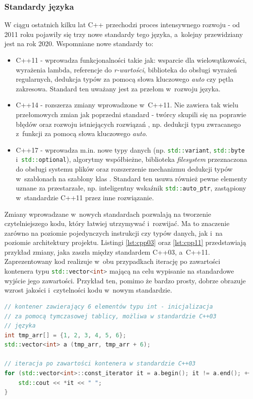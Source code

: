 \subsubsection*{Standardy języka}
W ciągu ostatnich kilku lat C++ przechodzi proces intensywnego rozwoju - od 2011 roku pojawiły się trzy nowe standardy tego języka, a~kolejny przewidziany jest na rok 2020. Wspomniane nowe standardy to:
\begin{itemize}
\item C++11 - wprowadza funkcjonalności takie jak: wsparcie dla wielowątkowości, wyrażenia lambda, referencje do \textit{r-wartości}, biblioteka do obsługi wyrażeń regularnych, dedukcja typów za pomocą słowa kluczowego \textit{auto} czy pętla zakresowa. Standard ten uważany jest za przełom w~rozwoju języka.
\item C++14 - rozszerza zmiany wprowadzone w~C++11. Nie zawiera tak wielu przełomowych zmian jak poprzedni standard - twórcy skupili się na poprawie błędów oraz rozwoju istniejących rozwiązań \cite{Cpp14Wikipedia}, np. dedukcji typu zwracanego z~funkcji za pomocą słowa kluczowego \textit{auto}.
\item C++17 - wprowadza m.in. nowe typy danych (np. \lstinline[language=c++]{std::variant}, \lstinline[language=c++]{std::byte} i~\lstinline[language=c++]{std::optional}), algorytmy współbieżne, biblioteka \textit{filesystem} przeznaczona do obsługi systemu plików oraz rozszerzenie mechanizmu dedukcji typów w~szablonach na szablony klas \cite{BartekCodingBlogCpp17}. Standard ten usuwa również pewne elementy uznane za przestarzałe, np. inteligentny wskaźnik \lstinline[language=c++]{std::auto_ptr}, zastąpiony w~standardzie C++11 przez inne rozwiązanie.
\end{itemize} 
Zmiany wprowadzane w~nowych standardach pozwalają na tworzenie czytelniejszego kodu, który łatwiej utrzymywać i~rozwijać. Ma to znaczenie zarówno na poziomie pojedynczych instrukcji czy typów danych, jak i~na poziomie architektury projektu. Listingi \ref{lst:cpp03} oraz \ref{lst:cpp11} przedstawiają przykład zmiany, jaka zaszła między standardem C++03, a~C++11. Zaprezentowany kod realizuje w~obu przypadkach iterację po zawartości kontenera typu \lstinline[language=c++]{std::vector<int>} mającą na celu wypisanie na standardowe wyjście jego zawartości. Przykład ten, pomimo że bardzo prosty, dobrze obrazuje wzrost jakości i~czytelności kodu w~nowym standardzie.

\begin{lstlisting}[language=c++,caption={Przykład kodu w~języku C++ napisany z~wykorzystaniem standardu C++03},label={lst:cpp03}]
// kontener zawierający 6 elementów typu int - inicjalizacja
// za pomocą tymczasowej tablicy, możliwa w standardzie C++03
// języka
int tmp_arr[] = {1, 2, 3, 4, 5, 6};
std::vector<int> a (tmp_arr, tmp_arr + 6);

// iteracja po zawartości kontenera w standardzie C++03
for (std::vector<int>::const_iterator it = a.begin(); it != a.end(); ++it) {
    std::cout << *it << " ";
}
\end{lstlisting}

